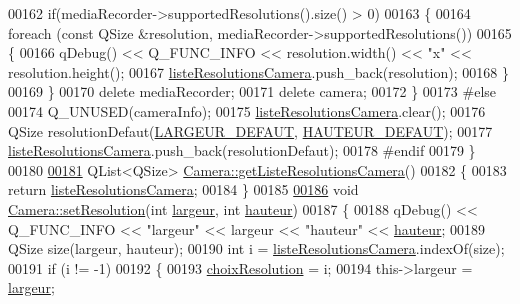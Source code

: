 \begin{DoxyCode}
00162         \textcolor{keywordflow}{if}(mediaRecorder->supportedResolutions().size() > 0)
00163         \{
00164             \textcolor{keywordflow}{foreach} (\textcolor{keyword}{const} QSize &resolution, mediaRecorder->supportedResolutions())
00165             \{
00166                 qDebug() << Q\_FUNC\_INFO << resolution.width() << \textcolor{stringliteral}{"x"} << resolution.height();
00167                 \hyperlink{class_camera_a96af62eaf7828664865b56e7c69e771c}{listeResolutionsCamera}.push\_back(resolution);
00168             \}
00169         \}
00170         \textcolor{keyword}{delete} mediaRecorder;
00171         \textcolor{keyword}{delete} camera;
00172     \}
00173 \textcolor{preprocessor}{    #else}
00174     Q\_UNUSED(cameraInfo);
00175     \hyperlink{class_camera_a96af62eaf7828664865b56e7c69e771c}{listeResolutionsCamera}.clear();
00176     QSize resolutionDefaut(\hyperlink{camera_8h_afe66edd1ec0aa05058aaa2a069248f65}{LARGEUR\_DEFAUT}, \hyperlink{camera_8h_a70cf269dc21e5a921c2927034d6cadd2}{HAUTEUR\_DEFAUT});
00177     \hyperlink{class_camera_a96af62eaf7828664865b56e7c69e771c}{listeResolutionsCamera}.push\_back(resolutionDefaut);
00178 \textcolor{preprocessor}{    #endif}
00179 \}
00180 
\hyperlink{class_camera_a997441a0c1e33fe3eda800953548071d}{00181} QList<QSize> \hyperlink{class_camera_a997441a0c1e33fe3eda800953548071d}{Camera::getListeResolutionsCamera}()
00182 \{
00183     \textcolor{keywordflow}{return} \hyperlink{class_camera_a96af62eaf7828664865b56e7c69e771c}{listeResolutionsCamera};
00184 \}
00185 
\hyperlink{class_camera_a966d13a5bf22c776f8d776d3da19182a}{00186} \textcolor{keywordtype}{void} \hyperlink{class_camera_a966d13a5bf22c776f8d776d3da19182a}{Camera::setResolution}(\textcolor{keywordtype}{int} \hyperlink{class_camera_ad64f26cdfc5aa561208b273d430938cf}{largeur}, \textcolor{keywordtype}{int} \hyperlink{class_camera_a5d89d7f9d1a5eab4175dd168c7fbf1c7}{hauteur})
00187 \{    
00188     qDebug() << Q\_FUNC\_INFO << \textcolor{stringliteral}{"largeur"} << largeur << \textcolor{stringliteral}{"hauteur"} << \hyperlink{class_camera_a5d89d7f9d1a5eab4175dd168c7fbf1c7}{hauteur};
00189     QSize size(largeur, hauteur);
00190     \textcolor{keywordtype}{int} i = \hyperlink{class_camera_a96af62eaf7828664865b56e7c69e771c}{listeResolutionsCamera}.indexOf(size);
00191     \textcolor{keywordflow}{if} (i != -1)
00192     \{
00193         \hyperlink{class_camera_a3fdddf6f548f04d7bdc26f32602a03d4}{choixResolution} = i;
00194         this->largeur = \hyperlink{class_camera_ad64f26cdfc5aa561208b273d430938cf}{largeur};

\end{DoxyCode}

